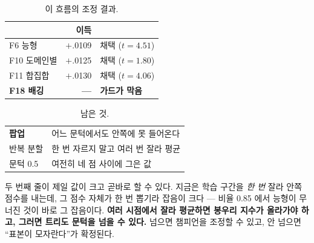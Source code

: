 \documentclass[10pt]{article}
\begin{document}
\begin{table}[t]
\centering\tsize
\caption{이 흐름의 조정 결과.}
\begin{tabular}{lrl}
\toprule
& 이득 & \\
\midrule
F6 능형 & $+$.0109 & 채택 ($t{=}4.51$) \\
F10 도메인별 & $+$.0125 & 채택 ($t{=}1.80$) \\
F11 합집합 & $+$.0130 & 채택 ($t{=}4.06$) \\
\textbf{F18 배깅} & \textbf{---} & \textbf{가드가 막음} \\
\bottomrule
\end{tabular}
\end{table}

\begin{table}[t]
\centering\tsize
\caption{남은 것.}
\begin{tabular}{ll}
\toprule
\textbf{팝업} & 어느 문턱에서도 안쪽에 못 들어온다 \\
반복 분할 & 한 번 자르지 말고 여러 번 잘라 평균 \\
문턱 0.5 & 여전히 네 점 사이에 그은 값 \\
\bottomrule
\end{tabular}
\end{table}

두 번째 줄이 제일 값이 크고 곧바로 할 수 있다. 지금은 학습 구간을 \emph{한
번} 잘라 안쪽 점수를 내는데, 그 점수 자체가 한 번 뽑기라 잡음이 크다 ---
비율 0.85 에서 능형이 무너진 것이 바로 그 잡음이다. \textbf{여러 시점에서
잘라 평균하면 봉우리 지수가 올라가야 하고, 그러면 트리도 문턱을 넘을 수
있다.} 넘으면 챔피언을 조정할 수 있고, 안 넘으면 ``표본이 모자란다''가
확정된다.
\end{document}
